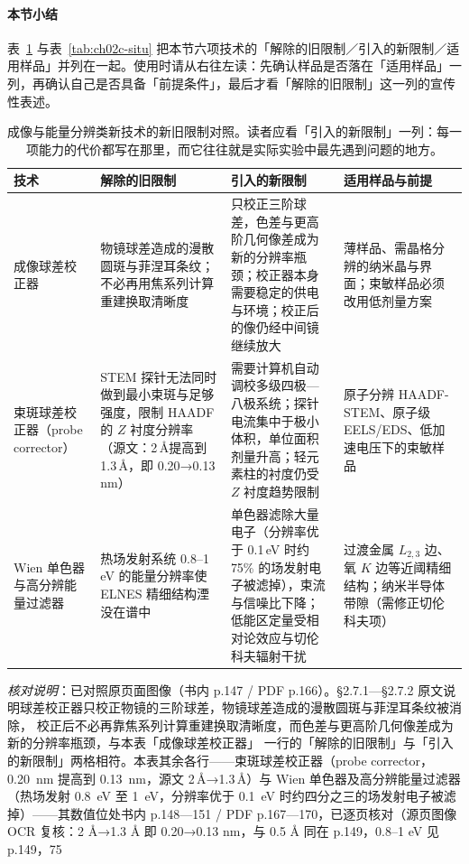 \paragraph{本节小结} 表~\ref{tab:ch02c-newold} 与表~\ref{tab:ch02c-situ} 把本节六项技术的「解除的旧限制／引入的新限制／适用样品」并列在一起。使用时请从右往左读：先确认样品是否落在「适用样品」一列，再确认自己是否具备「前提条件」，最后才看「解除的旧限制」这一列的宣传性表述。

\begin{table}[htbp]
\centering
\setlength{\tabcolsep}{4pt}
\small
\caption{成像与能量分辨类新技术的新旧限制对照。读者应看「引入的新限制」一列：每一项能力的代价都写在那里，而它往往就是实际实验中最先遇到问题的地方。}
\label{tab:ch02c-newold}
\begin{tabular}{@{}p{26mm}p{36mm}p{44mm}p{34mm}@{}}
\toprule
技术 & 解除的旧限制 & 引入的新限制 & 适用样品与前提 \\
\midrule
成像球差校正器 & 物镜球差造成的漫散圆斑与菲涅耳条纹；不必再用焦系列计算重建换取清晰度 & 只校正三阶球差，色差与更高阶几何像差成为新的分辨率瓶颈；校正器本身需要稳定的供电与环境；校正后的像仍经中间镜继续放大 & 薄样品、需晶格分辨的纳米晶与界面；束敏样品必须改用低剂量方案 \\
\addlinespace
束斑球差校正器（probe corrector） & STEM 探针无法同时做到最小束斑与足够强度，限制 HAADF 的 $Z$ 衬度分辨率（源文：2\,\AA 提高到 1.3\,\AA，即 0.20→0.13\,nm） & 需要计算机自动调校多级四极—八极系统；探针电流集中于极小体积，单位面积剂量升高；轻元素柱的衬度仍受 $Z$ 衬度趋势限制 & 原子分辨 HAADF-STEM、原子级 EELS/EDS、低加速电压下的束敏样品 \\
\addlinespace
Wien 单色器与高分辨能量过滤器 & 热场发射系统 0.8--1\,eV 的能量分辨率使 ELNES 精细结构湮没在谱中 & 单色器滤除大量电子（分辨率优于 0.1\,eV 时约 75\% 的场发射电子被滤掉），束流与信噪比下降；低能区定量受相对论效应与切伦科夫辐射干扰 & 过渡金属 $L_{2,3}$ 边、氧 $K$ 边等近阈精细结构；纳米半导体带隙（需修正切伦科夫项） \\
\bottomrule
\end{tabular}
\end{table}

\emph{核对说明}：已对照原页面图像（书内 p.147 / PDF p.166）。§2.7.1—§2.7.2
原文说明球差校正器只校正物镜的三阶球差，物镜球差造成的漫散圆斑与菲涅耳条纹被消除，
校正后不必再靠焦系列计算重建换取清晰度，而色差与更高阶几何像差成为新的分辨率瓶颈，与本表「成像球差校正器」
一行的「解除的旧限制」与「引入的新限制」两格相符。本表其余各行——束斑球差校正器（probe corrector，
\qty{0.20}{nm} 提高到 \qty{0.13}{nm}，源文 2\,\AA→1.3\,\AA）与 Wien
单色器及高分辨能量过滤器（热场发射 \qty{0.8}{eV} 至 \qty{1}{eV}，分辨率优于
\qty{0.1}{eV} 时约四分之三的场发射电子被滤掉）——其数值位处书内 p.148—151 / PDF
p.167—170，已逐页核对（源页图像 OCR 复核：2 Å→1.3 Å 即 0.20→0.13 nm，与 0.5 Å 同在 p.149，0.8–1 eV 见 p.149，75%


